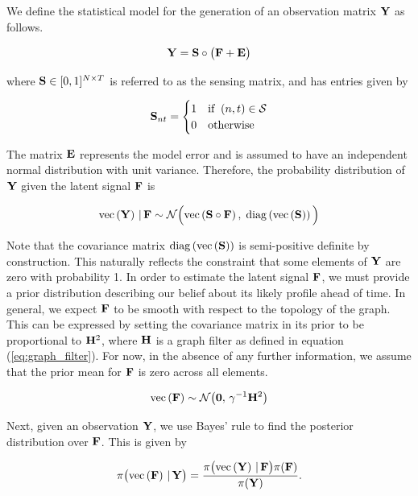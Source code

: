 We define the statistical model for the generation of an observation matrix $\mathbf{Y}$ as follows. 

\begin{equation}
    \mathbf{Y} = \mathbf{S} \circ \big(\mathbf{F} + \mathbf{E} \big)
\end{equation}

where $\mathbf{S} \in [0, 1]^{N \times T}$ is referred to as the sensing matrix, and has entries given by

\begin{equation}
    \mathbf{S}_{nt} = \begin{cases}
        1 & \text{if} \;\; (n, t) \in \mathcal{S} \\
        0 & \text{otherwise}
    \end{cases}
\end{equation}

The matrix $\mathbf{E}$ represents the model error and is assumed to have an independent normal distribution with unit variance. Therefore, the probability distribution of $\mathbf{Y}$ given the latent signal $\mathbf{F}$ is

\begin{equation}
    \label{eq:Y_given_F}
    \text{\textup{vec}}\left(\mathbf{Y}\right) \, | \, \mathbf{F} \sim \mathcal{N}\Big(\text{\textup{vec}}\left(\mathbf{S} \circ \mathbf{F}\right), \; \text{\textup{diag}}\left(\text{\textup{vec}}\left(\mathbf{S}\right)\right)\Big)
\end{equation}

Note that the covariance matrix $\text{\textup{diag}}\left(\text{\textup{vec}}\left(\mathbf{S}\right)\right)$ is semi-positive definite by construction. This naturally reflects the constraint that some elements of $\mathbf{Y}$ are zero with probability 1. In order to estimate the latent signal $\mathbf{F}$, we must provide a prior distribution describing our belief about its likely profile ahead of time. In general, we expect $\mathbf{F}$ to be smooth with respect to the topology of the graph. This can be expressed by setting the covariance matrix in its prior to be proportional to $\mathbf{H}^2$, where $\mathbf{H}$ is a graph filter as defined in equation (\ref{eq:graph_filter}). For now, in the absence of any further information, we assume that the prior mean for $\mathbf{F}$ is zero across all elements.

\begin{equation}
    \label{eq:F_prior}
    \text{\textup{vec}}\left(\mathbf{F}\right) \sim \mathcal{N}\big(\mathbf{0}, \, \gamma^{-1} \mathbf{H}^2\big)
\end{equation}

Next, given an observation $\mathbf{Y}$, we use Bayes' rule to find the posterior distribution over $\mathbf{F}$. This is given by

\begin{equation}
    \pi\big(\text{\textup{vec}}\left(\mathbf{F}\right) \, | \, \mathbf{Y} \big) = \frac{\pi\big(\text{\textup{vec}}\left(\mathbf{Y}\right) \, | \, \mathbf{F} \big) \pi(\mathbf{F}) }{\pi(\mathbf{Y})}.
\end{equation}

